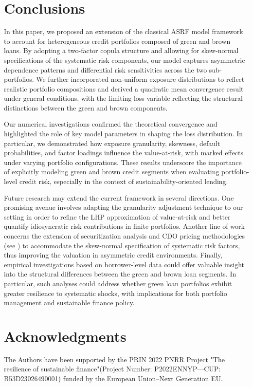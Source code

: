 \documentclass[preprint,12pt]{article}
\begin{document}
\section{Conclusions}

In this paper, we proposed an extension of the classical ASRF model framework to account for heterogeneous credit portfolios composed of green and brown loans. By adopting a two-factor copula structure and allowing for skew-normal specifications of the systematic risk components, our model captures asymmetric dependence patterns and differential risk sensitivities across the two sub-portfolios. We further incorporated non-uniform exposure distributions to reflect realistic portfolio compositions and derived a quadratic mean convergence result under general conditions, with the limiting loss variable reflecting the structural distinctions between the green and brown components.

Our numerical investigations confirmed the theoretical convergence and highlighted the role of key model parameters in shaping the loss distribution. In particular, we demonstrated how exposure granularity, skewness, default probabilities, and factor loadings influence the value-at-risk, with marked effects under varying portfolio configurations. These results underscore the importance of explicitly modeling green and brown credit segments when evaluating portfolio-level credit risk, especially in the context of sustainability-oriented lending.

Future research may extend the current framework in several directions. One promising avenue involves adapting the granularity adjustment technique to our setting in order to refine the LHP approximation of value-at-risk and better quantify idiosyncratic risk contributions in finite portfolios. Another line of work concerns the extension of securitization analysis and CDO pricing methodologies (see \cite{agl21}) to accommodate the skew-normal specification of systematic risk factors, thus improving the valuation in asymmetric credit environments. Finally, empirical investigations based on borrower-level data could offer valuable insight into the structural differences between the green and brown loan segments. In particular, such analyses could address whether green loan portfolios exhibit greater resilience to systematic shocks, with implications for both portfolio management and sustainable finance policy.

\section{Acknowledgments}
The Authors have been supported by the PRIN 2022 PNRR Project "The resilience of sustainable finance"(Project Number: P2022ENNYP—CUP: B53D23026490001) funded by the European Union--Next Generation EU.
\end{document}
